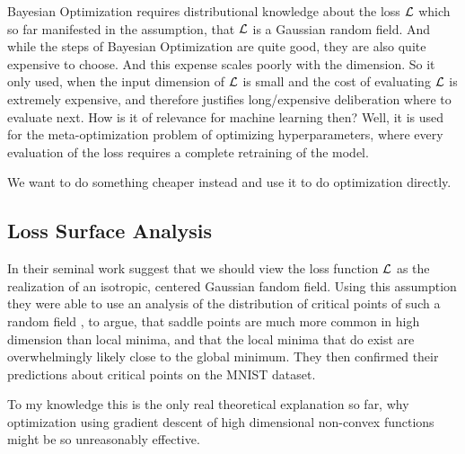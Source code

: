 Bayesian Optimization requires distributional knowledge
about the loss \(\mathcal{L}\) which so far manifested in the assumption, that
\(\mathcal{L}\) is a Gaussian random field. And while the steps of Bayesian
Optimization are quite good, they are also quite expensive to choose. And this
expense scales poorly with the dimension. So
it only used, when the input dimension of \(\mathcal{L}\) is small and the cost of
evaluating \(\mathcal{L}\) is extremely expensive, and therefore justifies
long/expensive deliberation where to evaluate next. How is it of relevance for
machine learning then? Well, it is used for the meta-optimization problem of
optimizing hyperparameters, where every evaluation of the loss requires a
complete retraining of the model.

We want to do something cheaper instead and use it to do optimization directly.

\subsection{Loss Surface Analysis}

In their seminal work 
\textcite{dauphinIdentifyingAttackingSaddle2014} suggest that we
should view the loss function \(\mathcal{L}\) as the realization of an isotropic,
centered Gaussian fandom field. Using this assumption they were able to use an
analysis of the distribution of critical points of such a random field
\parencite{brayStatisticsCriticalPoints2007}, to argue, that saddle points are
much more common in high dimension than local minima, and that the local minima
that do exist are overwhelmingly likely close to the global minimum. They
then confirmed their predictions about critical points on the MNIST dataset.

To my knowledge this is the only real theoretical explanation so far, why
optimization using gradient descent of high dimensional non-convex functions
might be so unreasonably effective.

